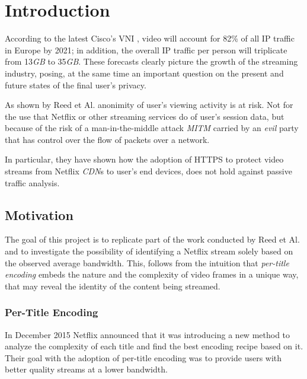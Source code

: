 \chapter{Introduction}\label{sec:introduction}

According to the latest Cisco's VNI \cite{video-traffic-forecast}, video will
account for 82\% of all IP traffic in Europe by 2021; in addition, the overall IP
traffic per person will triplicate from 13\emph{GB} to 35\emph{GB}. These
forecasts clearly picture the growth of the streaming industry, posing, at the
same time an important question on the present and future states of the final
user's privacy.

As shown by Reed et Al. \cite{netflix-real-time} anonimity of user's viewing
activity is at risk. Not for the use that Netflix or other streaming services
do of user's session data, but because of the risk of a man-in-the-middle
attack \emph{MITM} carried by an \textit{evil} party that has control over the
flow of packets over a network. %

In particular, they have shown how the adoption of HTTPS to protect video
streams from Netflix \emph{CDN}s to user's end devices, does not hold against
passive traffic analysis.

\section{Motivation}\label{motivation}

The goal of this project is to replicate part of the work conducted by Reed et
Al. and to investigate the possibility of identifying a Netflix stream solely
based on the observed average bandwidth. This, follows from the intuition that
\emph{per-title encoding} embeds the nature and the complexity of video frames
in a unique way, that may reveal the identity of the content being streamed.

\subsection{Per-Title Encoding}\label{sec:per-title-encoding}

In December 2015 Netflix announced \cite{per-title-encoding} that it was
introducing a new method to analyze the complexity of each title and find the
best encoding recipe based on it. Their goal with the adoption of
per-title encoding was to provide users with better quality streams at a lower
bandwidth. 

